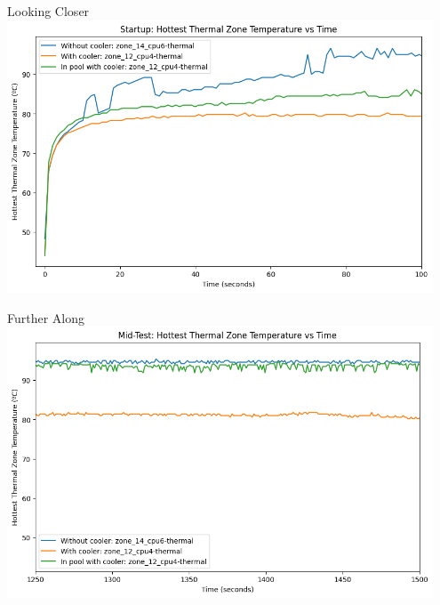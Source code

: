 \begin{frame}{Looking Closer}
    \includegraphics[width=0.95\textwidth,keepaspectratio]{images/startup_hottest_zone.png}
\end{frame}

\begin{frame}{Further Along}
    \includegraphics[width=0.95\textwidth,keepaspectratio]{images/mid-test_hottest_zone.png}
\end{frame}


